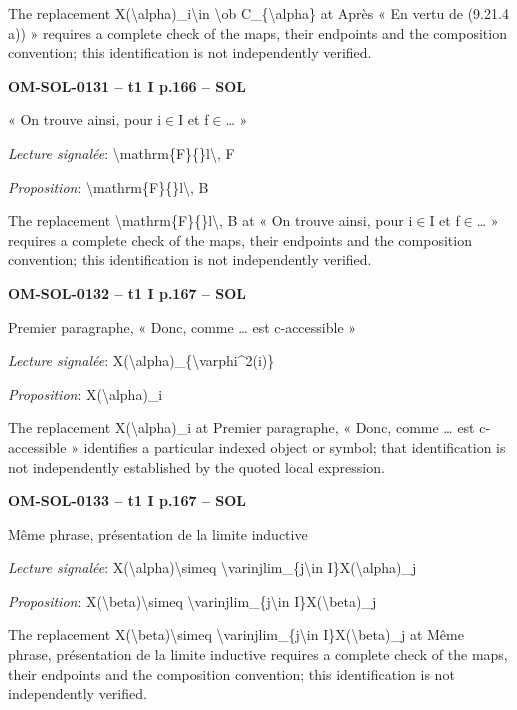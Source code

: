 The replacement X(\textbackslash{}alpha)\_i\textbackslash{}in \textbackslash{}ob C\_\{\textbackslash{}alpha\} at Après « En vertu de (9.21.4 a)) » requires a complete check of the maps, their endpoints and the composition convention; this identification is not independently verified.\par
\par\noindent\textbf{OM-SOL-0131 -- t1 I p.166 -- SOL}\par
« On trouve ainsi, pour i\ensuremath{\in}I et f\ensuremath{\in}… »\par
\emph{Lecture signalée}: \textbackslash{}mathrm\{F\}\{\}l\textbackslash{}, F\par
\emph{Proposition}: \textbackslash{}mathrm\{F\}\{\}l\textbackslash{}, B\par
The replacement \textbackslash{}mathrm\{F\}\{\}l\textbackslash{}, B at « On trouve ainsi, pour i\ensuremath{\in}I et f\ensuremath{\in}… » requires a complete check of the maps, their endpoints and the composition convention; this identification is not independently verified.\par
\par\noindent\textbf{OM-SOL-0132 -- t1 I p.167 -- SOL}\par
Premier paragraphe, « Donc, comme … est c-accessible »\par
\emph{Lecture signalée}: X(\textbackslash{}alpha)\_\{\textbackslash{}varphi\textasciicircum{}2(i)\}\par
\emph{Proposition}: X(\textbackslash{}alpha)\_i\par
The replacement X(\textbackslash{}alpha)\_i at Premier paragraphe, « Donc, comme … est c-accessible » identifies a particular indexed object or symbol; that identification is not independently established by the quoted local expression.\par
\par\noindent\textbf{OM-SOL-0133 -- t1 I p.167 -- SOL}\par
Même phrase, présentation de la limite inductive\par
\emph{Lecture signalée}: X(\textbackslash{}alpha)\textbackslash{}simeq \textbackslash{}varinjlim\_\{j\textbackslash{}in I\}X(\textbackslash{}alpha)\_j\par
\emph{Proposition}: X(\textbackslash{}beta)\textbackslash{}simeq \textbackslash{}varinjlim\_\{j\textbackslash{}in I\}X(\textbackslash{}beta)\_j\par
The replacement X(\textbackslash{}beta)\textbackslash{}simeq \textbackslash{}varinjlim\_\{j\textbackslash{}in I\}X(\textbackslash{}beta)\_j at Même phrase, présentation de la limite inductive requires a complete check of the maps, their endpoints and the composition convention; this identification is not independently verified.\par
